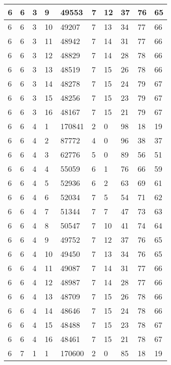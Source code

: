 \begin{table}[!ht]
\begin{tabular}{|l|l|l|l|l|l|l|l|l|l|}
        6 & 6 & 3 & 9 & 49553 & 7 & 12 & 37 & 76 & 65 \\ \hline
        6 & 6 & 3 & 10 & 49207 & 7 & 13 & 34 & 77 & 66 \\ \hline
        6 & 6 & 3 & 11 & 48942 & 7 & 14 & 31 & 77 & 66 \\ \hline
        6 & 6 & 3 & 12 & 48829 & 7 & 14 & 28 & 78 & 66 \\ \hline
        6 & 6 & 3 & 13 & 48519 & 7 & 15 & 26 & 78 & 66 \\ \hline
        6 & 6 & 3 & 14 & 48278 & 7 & 15 & 24 & 79 & 67 \\ \hline
        6 & 6 & 3 & 15 & 48256 & 7 & 15 & 23 & 79 & 67 \\ \hline
        6 & 6 & 3 & 16 & 48167 & 7 & 15 & 21 & 79 & 67 \\ \hline
        6 & 6 & 4 & 1 & 170841 & 2 & 0 & 98 & 18 & 19 \\ \hline
        6 & 6 & 4 & 2 & 87772 & 4 & 0 & 96 & 38 & 37 \\ \hline
        6 & 6 & 4 & 3 & 62776 & 5 & 0 & 89 & 56 & 51 \\ \hline
        6 & 6 & 4 & 4 & 55059 & 6 & 1 & 76 & 66 & 59 \\ \hline
        6 & 6 & 4 & 5 & 52936 & 6 & 2 & 63 & 69 & 61 \\ \hline
        6 & 6 & 4 & 6 & 52034 & 7 & 5 & 54 & 71 & 62 \\ \hline
        6 & 6 & 4 & 7 & 51344 & 7 & 7 & 47 & 73 & 63 \\ \hline
        6 & 6 & 4 & 8 & 50547 & 7 & 10 & 41 & 74 & 64 \\ \hline
        6 & 6 & 4 & 9 & 49752 & 7 & 12 & 37 & 76 & 65 \\ \hline
        6 & 6 & 4 & 10 & 49450 & 7 & 13 & 34 & 76 & 65 \\ \hline
        6 & 6 & 4 & 11 & 49087 & 7 & 14 & 31 & 77 & 66 \\ \hline
        6 & 6 & 4 & 12 & 48987 & 7 & 14 & 28 & 77 & 66 \\ \hline
        6 & 6 & 4 & 13 & 48709 & 7 & 15 & 26 & 78 & 66 \\ \hline
        6 & 6 & 4 & 14 & 48646 & 7 & 15 & 24 & 78 & 66 \\ \hline
        6 & 6 & 4 & 15 & 48488 & 7 & 15 & 23 & 78 & 67 \\ \hline
        6 & 6 & 4 & 16 & 48461 & 7 & 15 & 21 & 78 & 67 \\ \hline
        6 & 7 & 1 & 1 & 170600 & 2 & 0 & 85 & 18 & 19 \\ \hline

\end{tabular}
\end{table}
